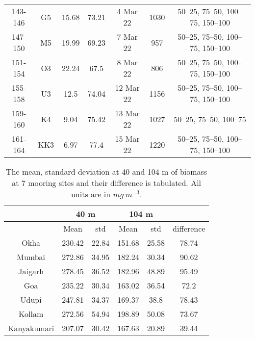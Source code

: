 \documentclass{article}
\begin{document}
\begin{table}[htbp]
{\begin{adjustwidth}{0in}{0in}
\begin{tabular}{ccccccc}
				143-146       & G5  & 15.68      & 73.21      & 4 Mar 22                  & 1030       & 50–25, 75–50, 100–75, 150–100 \\
				147-150       & M5  & 19.99      & 69.23      & 7 Mar 22                  & 957        & 50–25, 75–50, 100–75, 150–100 \\
				151-154       & O3  & 22.24      & 67.5       & 8 Mar 22                  & 806        & 50–25, 75–50, 100–75, 150–100 \\
				155-158       & U3  & 12.5       & 74.04      & 12 Mar 22                 & 1156       & 50–25, 75–50, 100–75, 150–100 \\
				159-160       & K4  & 9.04       & 75.42      & 13 Mar 22                 & 1027       & 50–25, 75–50, 100–75          \\
				161-164       & KK3 & 6.97       & 77.4       & 15 Mar 22                 & 1220       & 50–25, 75–50, 100–75, 150–100
				\\ 
				\bottomrule
			\end{tabular}
		\end{adjustwidth}
		\label{tab:table2}
	}
\end{table}

\newpage
\begin{table}[t]
	
	{\footnotesize
		\captionsetup{justification=justified,font=footnotesize,skip=0.05\baselineskip,width*=\columnwidth} %
		\caption{\newline The mean, standard deviation at 40 and 104 m of biomass at 7 mooring sites and their difference is tabulated. All units are in $mg \ m^{-3}$.}
	\begin{adjustwidth}{0in}{0in} 
	\begin{tabular}{cccccc}
		\toprule
		& \multicolumn{2}{c}{40 m} & \multicolumn{2}{c}{104 m} &            \\ \hline
		& Mean        & std        & Mean         & std        & difference \\ \hline
		Okha        & 230.42      & 22.84      & 151.68       & 25.58      & 78.74      \\
		Mumbai      & 272.86      & 34.95      & 182.24       & 30.34      & 90.62      \\
		Jaigarh     & 278.45      & 36.52      & 182.96       & 48.89      & 95.49      \\
		Goa         & 235.22      & 30.34      & 163.02       & 36.54      & 72.2       \\
		Udupi       & 247.81      & 34.37      & 169.37       & 38.8       & 78.43      \\
		Kollam      & 272.56      & 54.94      & 198.89       & 50.08      & 73.67      \\
		Kanyakumari & 207.07      & 30.42      & 167.63       & 20.89      & 39.44  \\ \bottomrule  
	\end{tabular}
	\end{adjustwidth}
    \label{tab:table3}
    }
\end{table}
\end{document}
